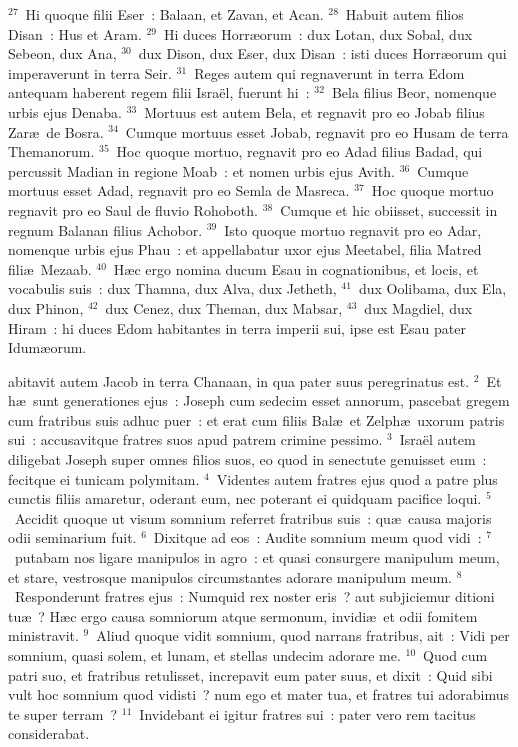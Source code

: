 ${}^{27}$~Hi quoque filii Eser~: Balaan, et Zavan, et Acan.
${}^{28}$~Habuit autem filios Disan~: Hus et Aram.
${}^{29}$~Hi duces Horr\ae orum~: dux Lotan, dux Sobal, dux Sebeon, dux Ana,
${}^{30}$~dux Dison, dux Eser, dux Disan~: isti duces Horr\ae orum qui imperaverunt in terra Seir.
${}^{31}$~Reges autem qui regnaverunt in terra Edom antequam haberent regem filii Isra\"el, fuerunt hi~:
${}^{32}$~Bela filius Beor, nomenque urbis ejus Denaba.
${}^{33}$~Mortuus est autem Bela, et regnavit pro eo Jobab filius Zar\ae\ de Bosra.
${}^{34}$~Cumque mortuus esset Jobab, regnavit pro eo Husam de terra Themanorum.
${}^{35}$~Hoc quoque mortuo, regnavit pro eo Adad filius Badad, qui percussit Madian in regione Moab~: et nomen urbis ejus Avith.
${}^{36}$~Cumque mortuus esset Adad, regnavit pro eo Semla de Masreca.
${}^{37}$~Hoc quoque mortuo regnavit pro eo Saul de fluvio Rohoboth.
${}^{38}$~Cumque et hic obiisset, successit in regnum Balanan filius Achobor.
${}^{39}$~Isto quoque mortuo regnavit pro eo Adar, nomenque urbis ejus Phau~: et appellabatur uxor ejus Meetabel, filia Matred fili\ae\ Mezaab.
${}^{40}$~H\ae c ergo nomina ducum Esau in cognationibus, et locis, et vocabulis suis~: dux Thamna, dux Alva, dux Jetheth,
${}^{41}$~dux Oolibama, dux Ela, dux Phinon,
${}^{42}$~dux Cenez, dux Theman, dux Mabsar,
${}^{43}$~dux Magdiel, dux Hiram~: hi duces Edom habitantes in terra imperii sui, ipse est Esau pater Idum\ae orum.

\bchapter
{}abitavit autem Jacob in terra Chanaan, in qua pater suus peregrinatus est.
${}^{2}$~Et h\ae\ sunt generationes ejus~: Joseph cum sedecim esset annorum, pascebat gregem cum fratribus suis adhuc puer~: et erat cum filiis Bal\ae\ et Zelph\ae\ uxorum patris sui~: accusavitque fratres suos apud patrem crimine pessimo.
${}^{3}$~Isra\"el autem diligebat Joseph super omnes filios suos, eo quod in senectute genuisset eum~: fecitque ei tunicam polymitam.
${}^{4}$~Videntes autem fratres ejus quod a patre plus cunctis filiis amaretur, oderant eum, nec poterant ei quidquam pacifice loqui.
${}^{5}$~Accidit quoque ut visum somnium referret fratribus suis~: qu\ae\ causa majoris odii seminarium fuit.
${}^{6}$~Dixitque ad eos~: Audite somnium meum quod vidi~:
${}^{7}$~putabam nos ligare manipulos in agro~: et quasi consurgere manipulum meum, et stare, vestrosque manipulos circumstantes adorare manipulum meum.
${}^{8}$~Responderunt fratres ejus~: Numquid rex noster eris~? aut subjiciemur ditioni tu\ae~? H\ae c ergo causa somniorum atque sermonum, invidi\ae\ et odii fomitem ministravit.
${}^{9}$~Aliud quoque vidit somnium, quod narrans fratribus, ait~: Vidi per somnium, quasi solem, et lunam, et stellas undecim adorare me.
${}^{10}$~Quod cum patri suo, et fratribus retulisset, increpavit eum pater suus, et dixit~: Quid sibi vult hoc somnium quod vidisti~? num ego et mater tua, et fratres tui adorabimus te super terram~?
${}^{11}$~Invidebant ei igitur fratres sui~: pater vero rem tacitus considerabat.


